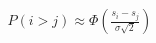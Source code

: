 \documentclass[preview]{standalone}
\begin{document}
\begin{align*}
P(i > j) \approx \Phi\left(\frac{s_i - s_j}{\sigma\sqrt{2}}\right)
\end{align*}
\end{document}
